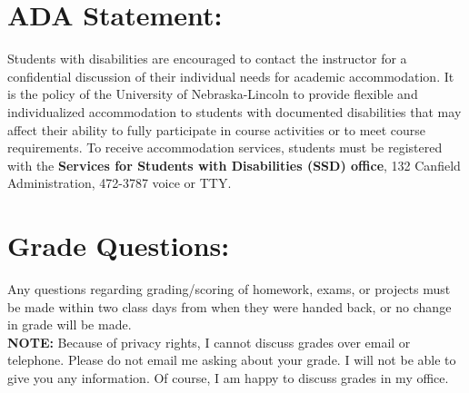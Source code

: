 \documentclass[margin]{res}
\theoremstyle{plain}
\theoremstyle{definition}
\theoremstyle{remark}
\begin{document}
\begin{resume}
\section{ADA  Statement:} Students with disabilities are encouraged to contact the instructor for a confidential discussion of their individual needs for academic accommodation. It is the policy of the University of Nebraska-Lincoln to provide flexible and individualized accommodation to students with documented disabilities that may affect their ability to fully participate in course activities or to meet course requirements. To receive accommodation services, students must be registered with the  {\bf Services for Students with Disabilities (SSD) office}, 132 Canfield Administration, 472-3787 voice or TTY. 


\section{Grade Questions:} 
Any questions regarding grading/scoring of homework, exams, or projects must be made within two class days from when they were handed back, or no change in grade will be made.  
\\\textbf{NOTE:} Because of privacy rights, I cannot discuss grades over email or telephone. Please do not email me asking about your grade.  I will not be able to give you any information.  Of course, I am happy to discuss grades in my office.


\end{resume}
\end{document}
